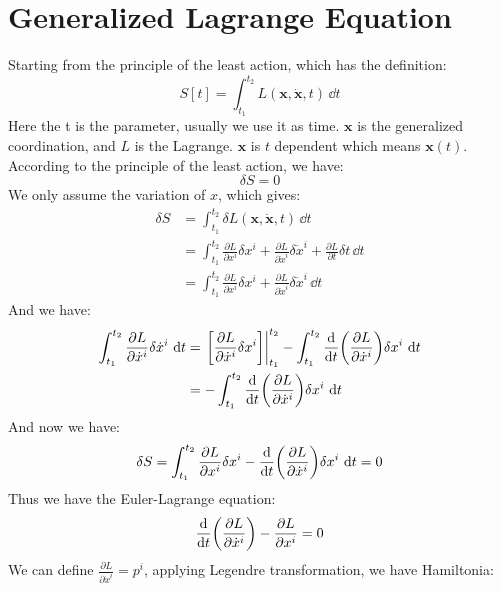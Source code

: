 \documentclass[../main.tex]{subfiles}
\begin{document}
\section{\textbf{Generalized Lagrange Equation}}
Starting from the principle of the least action, which has the definition:
\begin{equation}
  S[t] = \int_{t_1}^{t_2} L(\bm{x}, \dot{\bm{x}}, t)\,\dd{t}
\end{equation}
Here the t is the parameter, usually we use it as time. $\bm{x}$ is the generalized coordination, and $L$ is the Lagrange. $\bm{x}$ is $t$ dependent
which means $\bm{x}(t)$. According to the 
principle of the least action, we have:
\begin{equation}
  \delta S = 0
\end{equation}
We only assume the variation of $x$, which gives:
\begin{align}
  \delta S &= \int_{t_1}^{t_2} \delta L(\bm{x}, \dot{\bm{x}}, t)\,\dd{t}\nonumber\\
  &= \int_{t_1}^{t_2} \frac{\partial L}{\partial x^i}\delta x^i + \frac{\partial L}{\partial \dot{x}^i}\delta\dot{x}^i + \frac{\partial L}{\partial t}\delta t\,\dd{t}\nonumber\\
  &= \int_{t_1}^{t_2} \frac{\partial L}{\partial x^i}\delta x^i + \frac{\partial L}{\partial \dot{x}^i}\delta\dot{x}^i\,\dd{t}
\end{align}
And we have:
\begin{align}
  \int_{t_1}^{t_2} \frac{\partial L}{\partial\dot{x}^i}\delta\dot{x}^i \,\dd{t} &=  \left.\left[\frac{\partial L}{\partial \dot{x}^i}\delta x^i\right]\right|^{t_2}_{t_1}
  - \int_{t_1}^{t_2}\dv{t}(\frac{\partial L}{\partial \dot{x}^i})\delta x^i\,\dd{t}  \nonumber\\
  &= -\int_{t_1}^{t_2}\dv{t}(\frac{\partial L}{\partial \dot{x}^i})\delta x^i\,\dd{t} 
\end{align}
And now we have:
\begin{equation}
  \delta S = \int_{t_1}^{t_2} \frac{\partial L}{\partial x^i}\delta x^i - \dv{t}(\frac{\partial L}{\partial \dot{x}^i})\delta x^i\,\dd{t} = 0
\end{equation}
Thus we have the Euler-Lagrange equation:
\begin{equation}
  \dv{t}(\frac{\partial L}{\partial \dot{x}^i}) - \frac{\partial L}{\partial x^i} = 0
\end{equation}
We can define $\frac{\partial L}{\partial \dot{x}^i} = p^i$, applying Legendre transformation, we have Hamiltonia:
\end{document}
